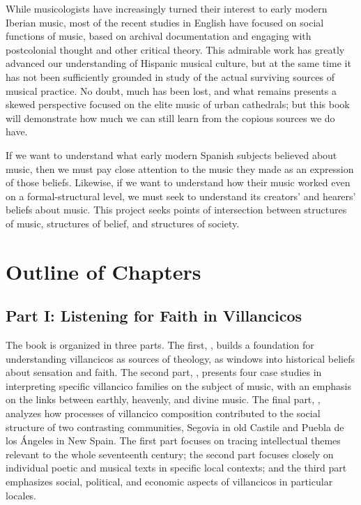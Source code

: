 \documentclass[tt]{vcbook-proposal}
\begin{document}
While musicologists have increasingly turned their interest to early modern Iberian music, most of the recent studies in English have focused on social functions of music, based on archival documentation and engaging with postcolonial thought and other critical theory.
This admirable work has greatly advanced our understanding of Hispanic musical culture, but at the same time it has not been sufficiently grounded in study of the actual surviving sources of musical practice.
No doubt, much has been lost, and what remains presents a skewed perspective focused on the elite music of urban cathedrals; but this book will demonstrate how much we can still learn from the copious sources we do have.

If we want to understand what early modern Spanish subjects believed about music, then we must pay close attention to the music they made as an expression of those beliefs.
Likewise, if we want to understand how their music worked even on a formal-structural level, we must seek to understand its creators' and hearers' beliefs about music.
This project seeks points of intersection between structures of music, structures of belief, and structures of society.


\section{Outline of Chapters}

\subsection{Part I: Listening for Faith in Villancicos}

The book is organized in three parts.
The first, , builds a foundation for understanding villancicos as sources of theology, as windows into historical beliefs about sensation and faith.
The second part, , presents four case studies in interpreting specific villancico families on the subject of music, with an emphasis on the links between earthly, heavenly, and divine music.
The final part, , analyzes how processes of villancico composition contributed to the social structure of two contrasting communities, Segovia in old Castile and Puebla de los Ángeles in New Spain.
The first part focuses on tracing intellectual themes relevant to the whole seventeenth century; the second part focuses closely on individual poetic and musical texts in specific local contexts; and the third part emphasizes social, political, and economic aspects of villancicos in particular locales.
\end{document}

